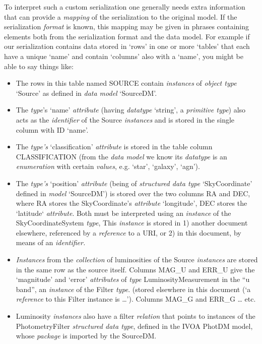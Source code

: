 \documentclass[11pt,a4paper]{ivoa}
\begin{document}
To interpret such a custom serialization one generally needs extra
information that can provide a \emph{mapping} of the serialization to
the original model. If the serialization \emph{format} is known, this
mapping may be given in phrases containing elements both from the
serialization format and the data model. For example if our
serialization contains data stored in `rows' in one or more `tables'
that each have a unique `name' and contain `columns' also with a `name',
you might be able to say things like:

\begin{itemize}
\item
  The rows in this table named SOURCE contain \emph{instances} of
  \emph{object type} `Source' as defined in \emph{data model}
  `SourceDM'.
\item
  The \emph{type}'s `name' \emph{attribute} (having \emph{datatype}
  `string', a \emph{primitive type}) also acts as the \emph{identifier}
  of the Source \emph{instances} and is stored in the single column with
  ID `name'.
\item
  The \emph{type's} `classification' \emph{attribute} is stored in the
  table column CLASSIFICATION (from the \emph{data model} we know its
  \emph{datatype} is an \emph{enumeration} with certain \emph{values},
  e.g. `star', `galaxy', `agn').
\item
  The \emph{type's} `position' \emph{attribute} (being of
  \emph{structured data type} `SkyCoordinate' defined in \emph{model}
  `SourceDM') is stored over the two columns RA and DEC, where RA stores
  the SkyCoordinate's \emph{attribute} `longitude', DEC stores the
  `latitude` \emph{attribute}. Both must be interpreted using an
  \emph{instance} of the SkyCoordinateSystem \emph{type}, This
  \emph{instance} is stored in 1) another document elsewhere, referenced
  by a \emph{reference} to a URI, or 2) in this document, by means of an
  \emph{identifier.}
\item
  \emph{Instances} from the \emph{collection} of luminosities of the
  Source \emph{instances} are stored in the same row as the source
  itself. Columns MAG\_U and ERR\_U give the `magnitude' and `error'
  \emph{attributes} of \emph{type} LuminosityMeasurement in the ``u
  band'', an \emph{instance} of the Filter \emph{type}. (stored
  elsewhere in this document (`a \emph{reference} to this Filter
  instance is \ldots{}'). Columns MAG\_G and ERR\_G \ldots{} etc.
\item
  Luminosity \emph{instances} also have a filter \emph{relation} that
  points to instances of the PhotometryFilter \emph{structured data
  type}, defined in the IVOA PhotDM model, whose \emph{package} is
  imported by the SourceDM.
\end{itemize}
\end{document}
